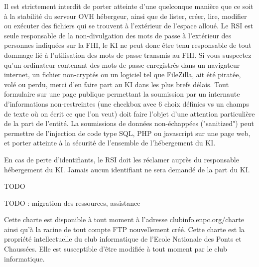 \documentclass{ki019}
\begin{document}
Il est strictement interdit de porter atteinte d'une quelconque manière que ce soit à la stabilité du serveur OVH hébergeur, ainsi que de lister, créer, lire, modifier ou exécuter des fichiers qui se trouvent à l'extérieur de l'espace alloué.
Le RSI est seule responsable de la non-divulgation des mots de passe à l'extérieur des personnes indiquées sur la FHI, le KI ne peut donc être tenu responsable de tout dommage lié à l'utilisation des mots de passe transmis au FHI. Si vous suspectez qu'un ordinateur contenant des mots de passe enregistrés dans un navigateur internet, un fichier non-cryptés ou un logiciel tel que FileZilla, ait été piratée, volé ou perdu, merci d'en faire part au KI dans les plus brefs délais.
Tout formulaire sur une page publique permettant la soumission par un internaute d'informations non-restreintes (une checkbox avec 6 choix définies vs un champs de texte où on écrit ce que l'on veut) doit faire l'objet d'une attention particulière de la part de l'entité. La soumissions de données non-échappées ("sanitized") peut permettre de l'injection de code type SQL, PHP ou javascript sur une page web, et porter atteinte à la sécurité de l'ensemble de l'hébergement du KI.


En cas de perte d'identifiants, le RSI doit les réclamer auprès du responsable hébergement du KI. Jamais aucun identifiant ne sera demandé de la part du KI.


TODO

TODO : migration des ressources, assistance

Cette charte est disponible à tout moment à l'adresse clubinfo.enpc.org/charte ainsi qu'à la racine de tout compte FTP nouvellement créé. Cette charte est la propriété intellectuelle du club informatique de l'Ecole Nationale des Ponts et Chaussées. Elle est susceptible d'être modifiée à tout moment par le club informatique.

\Footer{\today}
\end{document}
